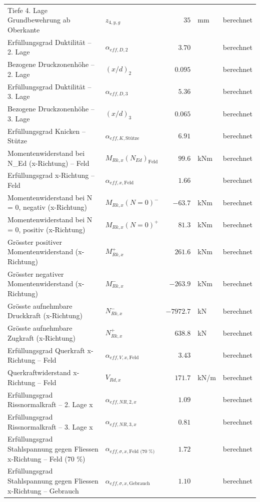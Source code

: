 \documentclass[11pt,a4paper]{article}
\begin{document}
\begin{xltabular}{\linewidth}{>{\raggedright\arraybackslash}Xlrll}
Tiefe 4. Lage Grundbewehrung ab Oberkante & $z_{4,y,g}$ & $35$ & mm & berechnet \\
Erfüllungsgrad Duktilität – 2. Lage & $\alpha_{eff,D,2}$ & $3.70$ &  & berechnet \\
Bezogene Druckzonenhöhe – 2. Lage & $\left(x/d\right)_{2}$ & $0.095$ &  & berechnet \\
Erfüllungsgrad Duktilität – 3. Lage & $\alpha_{eff,D,3}$ & $5.36$ &  & berechnet \\
Bezogene Druckzonenhöhe – 3. Lage & $\left(x/d\right)_{3}$ & $0.065$ &  & berechnet \\
Erfüllungsgrad Knicken – Stütze & $\alpha_{eff,K,\text{Stütze}}$ & $6.91$ &  & berechnet \\
Momentenwiderstand bei N\_Ed (x-Richtung) – Feld & $M_{Rk,x}(N_{Ed})_{\text{Feld}}$ & $99.6$ & kNm & berechnet \\
Erfüllungsgrad x-Richtung – Feld & $\alpha_{eff,x,\text{Feld}}$ & $1.66$ &  & berechnet \\
Momentenwiderstand bei N = 0, negativ (x-Richtung) & $M_{Rk,x}(N=0)^{-}$ & $-63.7$ & kNm & berechnet \\
Momentenwiderstand bei N = 0, positiv (x-Richtung) & $M_{Rk,x}(N=0)^{+}$ & $81.3$ & kNm & berechnet \\
Grösster positiver Momentenwiderstand (x-Richtung) & $M_{Rk,x}^{+}$ & $261.6$ & kNm & berechnet \\
Grösster negativer Momentenwiderstand (x-Richtung) & $M_{Rk,x}^{-}$ & $-263.9$ & kNm & berechnet \\
Grösste aufnehmbare Druckkraft (x-Richtung) & $N_{Rk,x}^{-}$ & $-7972.7$ & kN & berechnet \\
Grösste aufnehmbare Zugkraft (x-Richtung) & $N_{Rk,x}^{+}$ & $638.8$ & kN & berechnet \\
Erfüllungsgrad Querkraft x-Richtung – Feld & $\alpha_{eff,V,x,\text{Feld}}$ & $3.43$ &  & berechnet \\
Querkraftwiderstand x-Richtung – Feld & $V_{Rd,x}$ & $171.7$ & kN/m & berechnet \\
Erfüllungsgrad Rissnormalkraft – 2. Lage x & $\alpha_{eff,NR,2,x}$ & $1.09$ &  & berechnet \\
Erfüllungsgrad Rissnormalkraft – 3. Lage x & $\alpha_{eff,NR,3,x}$ & $0.81$ &  & berechnet \\
Erfüllungsgrad Stahlspannung gegen Fliessen x-Richtung – Feld (70 \%) & $\alpha_{eff,\sigma,x,\text{Feld (70 \%)}}$ & $1.72$ &  & berechnet \\
Erfüllungsgrad Stahlspannung gegen Fliessen x-Richtung – Gebrauch & $\alpha_{eff,\sigma,x,\text{Gebrauch}}$ & $1.10$ &  & berechnet \\

\end{xltabular}
\end{document}
